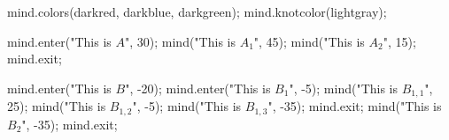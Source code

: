 \usemodule[mindmap]
\startMPpage
mind.colors(darkred, darkblue, darkgreen);
mind.knotcolor(lightgray);

mind.enter("This is $A$", 30);
    mind("This is $A_1$", 45);
    mind("This is $A_2$", 15);
mind.exit;

mind.enter("This is $B$", -20);
    mind.enter("This is $B_{1}$", -5);
        mind("This is $B_{1,1}$", 25);
        mind("This is $B_{1,2}$", -5);
        mind("This is $B_{1,3}$", -35);
    mind.exit;
    mind("This is $B_2$", -35);
mind.exit;
\stopMPpage

